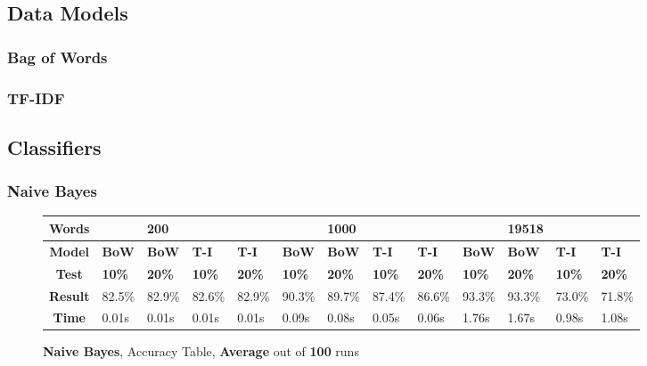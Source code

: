 \documentclass{article}
\begin{document}
	\subsection{Data Models}
	\subsubsection{Bag of Words}
	\subsubsection{TF-IDF}
	
	
	\subsection{Classifiers}
	\subsubsection{Naive Bayes}
	\begin{figure}[H]
		\begin{tabular}{||c||l|l|l|l||l|l|l|l||l|l|l|l||}
			\hline
			\textbf{Words} &  & \textbf{200} & & & &\textbf{1000} & & & & \textbf{19518} &  & \\ \hline 
			\textbf{Model} & \textbf{BoW} & \textbf{BoW} & \textbf{T-I} & \textbf{T-I} &\textbf{BoW} & \textbf{BoW} & \textbf{T-I} & \textbf{T-I} & \textbf{BoW} & \textbf{BoW} & \textbf{T-I} & \textbf{T-I}\\ \hline
			\textbf{Test} & \textbf{10\%} & \textbf{20\%} & \textbf{10\%} & \textbf{20\%} & \textbf{10\%} & \textbf{20\%} & \textbf{10\%} & \textbf{20\%} & \textbf{10\%} & \textbf{20\%} & \textbf{10\%} & \textbf{20\%} \\ \hline \hline  
			\textbf{Result} & 82.5\% & 82.9\% & 82.6\% & 82.9\% & 90.3\% & 89.7\% & 87.4\% & 86.6\% & 93.3\% & 93.3\% & 73.0\% & 71.8\% \\ \hline 
			\textbf{Time} & 0.01s & 0.01s & 0.01s & 0.01s & 0.09s & 0.08s & 0.05s & 0.06s & 1.76s & 1.67s & 0.98s & 1.08s \\ \hline 
		\end{tabular}
		\caption{\textbf{Naive Bayes}, Accuracy Table, \textbf{Average} out of \textbf{100} runs}
	\end{figure}
    
\end{document}
